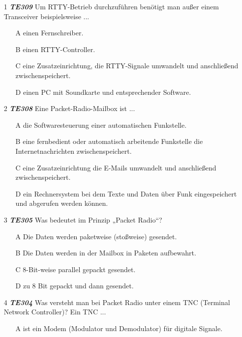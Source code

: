 \begin{enumerate} 
	\item[1] \emph{\textbf{TE309}} Um RTTY-Betrieb durchzuführen benötigt man außer einem Transceiver beispielsweise ...
	\begin{enumerate}
	\itemsep1pt\parskip0pt
		\item[A] einen Fernschreiber.
		\item[B] einen RTTY-Controller.
		\item[C] eine Zusatzeinrichtung, die RTTY-Signale umwandelt und anschließend zwischenspeichert.
		\item[D]  einen PC mit Soundkarte und entsprechender Software.
	\end{enumerate} 
	\item[2] \emph{\textbf{TE308}}  Eine Packet-Radio-Mailbox ist ...
	\begin{enumerate}
	\itemsep1pt\parskip0pt
		\item[A] die Softwaresteuerung einer automatischen Funkstelle.
		\item[B] eine fernbedient oder automatisch arbeitende Funkstelle die Internetnachrichten zwischenspeichert.
		\item[C] eine Zusatzeinrichtung die E-Mails umwandelt und anschließend zwischenspeichert.
		\item[D] ein Rechnersystem bei dem Texte und Daten über Funk eingespeichert und abgerufen werden können.
	\end{enumerate} 
	\item[3] \emph{\textbf{TE305}}  Was bedeutet im Prinzip „Packet Radio“?
	\begin{enumerate}
	\itemsep1pt\parskip0pt
		\item[A] Die Daten werden paketweise (stoßweise) gesendet.
		\item[B] Die Daten werden in der Mailbox in Paketen aufbewahrt.
		\item[C] 8-Bit-weise parallel gepackt gesendet.
		\item[D] zu 8 Bit gepackt und dann gesendet.
		\end{enumerate} 
	\item[4] \emph{\textbf{TE304}}  Was versteht man bei Packet Radio unter einem TNC (Terminal Network Controller)? Ein TNC ...
	\begin{enumerate}
	\itemsep1pt\parskip0pt
		\item[A] ist ein Modem (Modulator und Demodulator) für digitale Signale.

\end{enumerate}
\end{enumerate}
